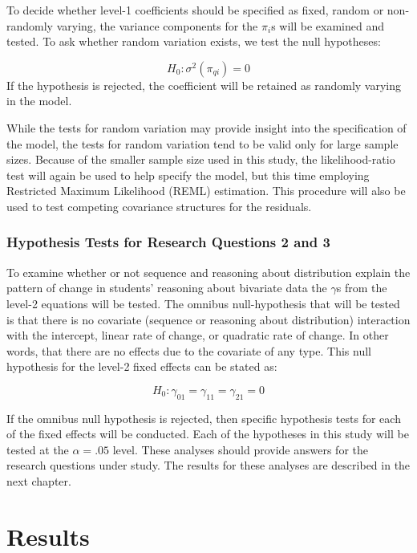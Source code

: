 \documentclass[11pt]{umnthesis}
\begin{document}
To decide whether level-1 coefficients should be specified as fixed, random or non-randomly varying, the variance components for the \(\pi_i\)s will be examined and tested. To ask whether random variation exists, we test the null hypotheses:

\[
H_0: \sigma^2(\pi_{qi}) = 0
\]
If the hypothesis is rejected, the coefficient will be retained as randomly varying in the model.

While the tests for random variation may provide insight into the specification of the model, the tests for random variation tend to be valid only for large sample sizes. Because of the smaller sample size used in this study, the likelihood-ratio test will again be used to help specify the model, but this time employing Restricted Maximum Likelihood (REML) estimation. This procedure will also be used to test competing covariance structures for the residuals.

\hypertarget{hypothesis-tests-for-research-questions-2-and-3}{%
\subsection{Hypothesis Tests for Research Questions 2 and 3}\label{hypothesis-tests-for-research-questions-2-and-3}}

To examine whether or not sequence and reasoning about distribution explain the pattern of change in students' reasoning about bivariate data the \(\gamma\)s from the level-2 equations will be tested. The omnibus null-hypothesis that will be tested is that there is no covariate (sequence or reasoning about distribution) interaction with the intercept, linear rate of change, or quadratic rate of change. In other words, that there are no effects due to the covariate of any type. This null hypothesis for the level-2 fixed effects can be stated as:

\[
H_0: \gamma_{01} = \gamma_{11} = \gamma_{21} = 0
\]

If the omnibus null hypothesis is rejected, then specific hypothesis tests for each of the fixed effects will be conducted. Each of the hypotheses in this study will be tested at the \(\alpha=.05\) level. These analyses should provide answers for the research questions under study. The results for these analyses are described in the next chapter.

\hypertarget{results}{%
\chapter{Results}\label{results}}
\end{document}
